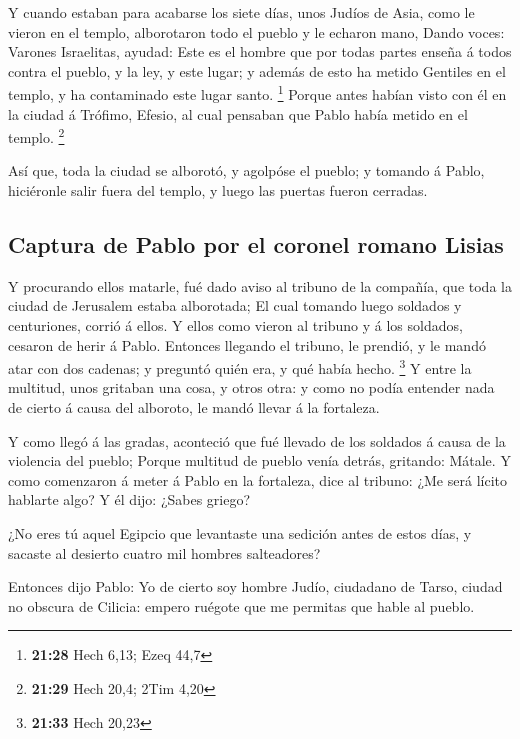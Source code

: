  Y cuando estaban para acabarse los siete días, unos
Judíos de Asia, como le vieron en el templo, alborotaron todo el pueblo
y le echaron mano,  Dando voces: Varones Israelitas,
ayudad: Este es el hombre que por todas partes enseña á todos contra el
pueblo, y la ley, y este lugar; y además de esto ha metido Gentiles en
el templo, y ha contaminado este lugar santo. \footnote{\textbf{21:28}
  Hech 6,13; Ezeq 44,7}  Porque antes habían visto con él
en la ciudad á Trófimo, Efesio, al cual pensaban que Pablo había metido
en el templo. \footnote{\textbf{21:29} Hech 20,4; 2Tim 4,20}

 Así que, toda la ciudad se alborotó, y agolpóse el
pueblo; y tomando á Pablo, hiciéronle salir fuera del templo, y luego
las puertas fueron cerradas.

\hypertarget{captura-de-pablo-por-el-coronel-romano-lisias}{%
\subsection{Captura de Pablo por el coronel romano
Lisias}\label{captura-de-pablo-por-el-coronel-romano-lisias}}

 Y procurando ellos matarle, fué dado aviso al tribuno de
la compañía, que toda la ciudad de Jerusalem estaba alborotada;
 El cual tomando luego soldados y centuriones, corrió á
ellos. Y ellos como vieron al tribuno y á los soldados, cesaron de herir
á Pablo.  Entonces llegando el tribuno, le prendió, y le
mandó atar con dos cadenas; y preguntó quién era, y qué había hecho.
\footnote{\textbf{21:33} Hech 20,23}  Y entre la
multitud, unos gritaban una cosa, y otros otra: y como no podía entender
nada de cierto á causa del alboroto, le mandó llevar á la fortaleza.

 Y como llegó á las gradas, aconteció que fué llevado de
los soldados á causa de la violencia del pueblo;  Porque
multitud de pueblo venía detrás, gritando: Mátale.  Y
como comenzaron á meter á Pablo en la fortaleza, dice al tribuno: ¿Me
será lícito hablarte algo? Y él dijo: ¿Sabes griego?

 ¿No eres tú aquel Egipcio que levantaste una sedición
antes de estos días, y sacaste al desierto cuatro mil hombres
salteadores?

 Entonces dijo Pablo: Yo de cierto soy hombre Judío,
ciudadano de Tarso, ciudad no obscura de Cilicia: empero ruégote que me
permitas que hable al pueblo.

